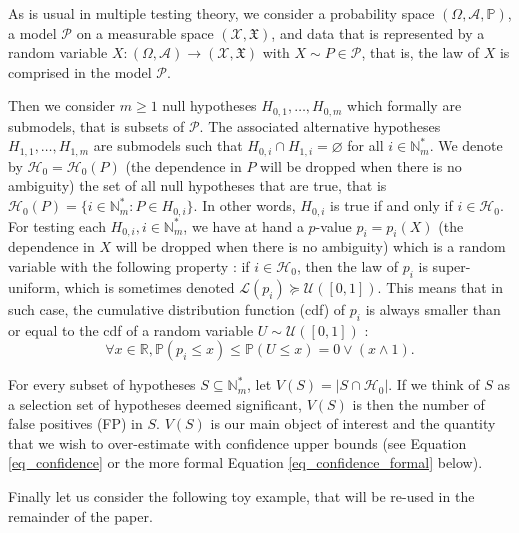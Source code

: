 \documentclass[
  11pt,
  a4paper,
]{article}
\theoremstyle{plain}
\theoremstyle{plain}
\theoremstyle{plain}
\theoremstyle{definition}
\theoremstyle{definition}
\theoremstyle{remark}
\begin{document}
As is usual in multiple testing theory, we consider a probability space
\((\Omega,\mathcal A, \mathbb P)\), a model \(\mathcal{P}\) on a
measurable space \((\mathcal{X},\mathfrak{X})\), and data that is
represented by a random variable
\(X:(\Omega,\mathcal A)\to(\mathcal{X},\mathfrak{X})\) with
\(X\sim P\in \mathcal{P}\), that is, the law of \(X\) is comprised in
the model \(\mathcal{P}\).

Then we consider \(m\geq1\) null hypotheses \(H_{0,1}, \dotsc, H_{0,m}\)
which formally are submodels, that is subsets of \(\mathcal{P}\). The
associated alternative hypotheses \(H_{1,1}, \dotsc, H_{1,m}\) are
submodels such that \(H_{0,i}\cap H_{1,i}=\varnothing\) for all
\(i\in\mathbb{N}_m^*\). We denote by \(\mathcal{H}_0=\mathcal{H}_0(P)\)
(the dependence in \(P\) will be dropped when there is no ambiguity) the
set of all null hypotheses that are true, that is
\(\mathcal{H}_0(P)=\{i\in\mathbb{N}_m^* : P\in H_{0,i}\}\). In other
words, \(H_{0,i}\) is true if and only if \(i\in\mathcal{H}_0\). For
testing each \(H_{0,i}, i\in\mathbb{N}_m^*\), we have at hand a
\(p\)-value \(p_i=p_i(X)\) (the dependence in \(X\) will be dropped when
there is no ambiguity) which is a random variable with the following
property : if \(i\in\mathcal{H}_0\), then the law of \(p_i\) is
super-uniform, which is sometimes denoted
\(\mathcal L(p_i)\succeq \mathcal{U}([0,1])\). This means that in such
case, the cumulative distribution function (cdf) of \(p_i\) is always
smaller than or equal to the cdf of a random variable
\(U\sim \mathcal{U}([0,1])\) : \begin{equation}
\forall x \in \mathbb{R}, \mathbb{P}\left(p_i\leq x\right)\leq \mathbb{P}\left(U\leq x\right) = 0\vee(x\wedge 1).
\label{eq_super_unif}
\end{equation}

For every subset of hypotheses \(S\subseteq\mathbb{N}_m^*\), let
\(V(S)=|S\cap\mathcal{H}_0|\). If we think of \(S\) as a selection set
of hypotheses deemed significant, \(V(S)\) is then the number of false
positives (FP) in \(S\). \(V(S)\) is our main object of interest and the
quantity that we wish to over-estimate with confidence upper bounds (see
Equation \eqref{eq_confidence} or the more formal Equation
\eqref{eq_confidence_formal} below).

Finally let us consider the following toy example, that will be re-used
in the remainder of the paper.
\end{document}
